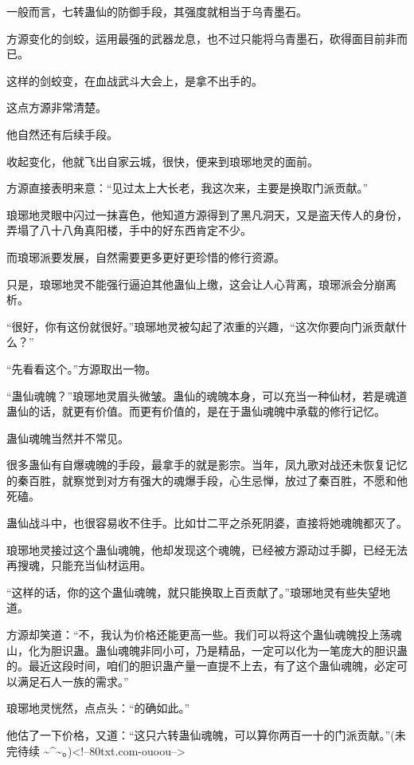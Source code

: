 \begin{this_body}
一般而言，七转蛊仙的防御手段，其强度就相当于乌青墨石。

方源变化的剑蛟，运用最强的武器龙息，也不过只能将乌青墨石，砍得面目前非而已。

这样的剑蛟变，在血战武斗大会上，是拿不出手的。

这点方源非常清楚。

他自然还有后续手段。

收起变化，他就飞出自家云城，很快，便来到琅琊地灵的面前。

方源直接表明来意：“见过太上大长老，我这次来，主要是换取门派贡献。”

琅琊地灵眼中闪过一抹喜色，他知道方源得到了黑凡洞天，又是盗天传人的身份，弄塌了八十八角真阳楼，手中的好东西肯定不少。

而琅琊派要发展，自然需要更多更好更珍惜的修行资源。

只是，琅琊地灵不能强行逼迫其他蛊仙上缴，这会让人心背离，琅琊派会分崩离析。

“很好，你有这份就很好。”琅琊地灵被勾起了浓重的兴趣，“这次你要向门派贡献什么？”

“先看看这个。”方源取出一物。

“蛊仙魂魄？”琅琊地灵眉头微皱。蛊仙的魂魄本身，可以充当一种仙材，若是魂道蛊仙的话，就更有价值。而更有价值的，是在于蛊仙魂魄中承载的修行记忆。

蛊仙魂魄当然并不常见。

很多蛊仙有自爆魂魄的手段，最拿手的就是影宗。当年，凤九歌对战还未恢复记忆的秦百胜，就察觉到对方有强大的魂爆手段，心生忌惮，放过了秦百胜，不愿和他死磕。

蛊仙战斗中，也很容易收不住手。比如廿二平之杀死阴婆，直接将她魂魄都灭了。

琅琊地灵接过这个蛊仙魂魄，他却发现这个魂魄，已经被方源动过手脚，已经无法再搜魂，只能充当仙材运用。

“这样的话，你的这个蛊仙魂魄，就只能换取上百贡献了。”琅琊地灵有些失望地道。

方源却笑道：“不，我认为价格还能更高一些。我们可以将这个蛊仙魂魄投上荡魂山，化为胆识蛊。蛊仙魂魄非同小可，乃是精品，一定可以化为一笔庞大的胆识蛊的。最近这段时间，咱们的胆识蛊产量一直提不上去，有了这个蛊仙魂魄，必定可以满足石人一族的需求。”

琅琊地灵恍然，点点头：“的确如此。”

他估了一下价格，又道：“这只六转蛊仙魂魄，可以算你两百一十的门派贡献。”(未完待续 \~{}\^{}\~{}。)<!--80txt.com-ouoou-->

\end{this_body}

